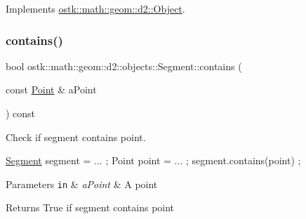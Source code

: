 Implements \hyperlink{classostk_1_1math_1_1geom_1_1d2_1_1_object_a98dedc6792aef35308966ca768eb3e14}{ostk\+::math\+::geom\+::d2\+::\+Object}.

\mbox{\label{classostk_1_1math_1_1geom_1_1d2_1_1objects_1_1_segment_a08468b912471a18d29062b96968afc2f}} 
\subsubsection{\texorpdfstring{contains()}{contains()}\hspace{0.1cm}{\footnotesize\ttfamily [1/2]}}
{\footnotesize\ttfamily bool ostk\+::math\+::geom\+::d2\+::objects\+::\+Segment\+::contains (\begin{DoxyParamCaption}\item[{const \hyperlink{classostk_1_1math_1_1geom_1_1d2_1_1objects_1_1_point}{Point} \&}]{a\+Point }\end{DoxyParamCaption}) const}



Check if segment contains point. 


\begin{DoxyCode}
\hyperlink{classostk_1_1math_1_1geom_1_1d2_1_1objects_1_1_segment_a56c91f22315d7cefe9d5e9973330028d}{Segment} segment = ... ;
Point point = ... ;
segment.contains(point) ;
\end{DoxyCode}



\begin{DoxyParams}[1]{Parameters}
\mbox{\tt in}  & {\em a\+Point} & A point \\
\hline
\end{DoxyParams}
\begin{DoxyReturn}{Returns}
True if segment contains point 
\end{DoxyReturn}
\mbox{\label{classostk_1_1math_1_1geom_1_1d2_1_1objects_1_1_segment_afd9fea7d6b73c7136ddb1246e20134d3}} 
